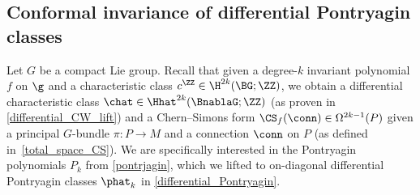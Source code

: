 
\subsection{Conformal invariance of differential Pontryagin classes}
\label{ssec:conformal_invariance}
Let $G$ be a compact Lie group. Recall that given a degree-$k$ invariant polynomial $f$ on $\g$ and a
characteristic class $c^\ZZ\in\H^{2k}(\BG;\ZZ)$, we obtain a differential characteristic class $\chat\in
\Hhat^{2k}(\BnablaG;\ZZ)$ (as proven in \cref{differential_CW_lift}) and a Chern--Simons form
$\CS_f(\conn)\in\Omega^{2k-1}(P)$ given a principal $G$-bundle $\pi\colon P\to M$ and a connection $\conn$ on $P$
(as defined in~\eqref{total_space_CS}). We are specifically interested in the Pontryagin polynomials $P_k$ from
\cref{pontrjagin}, which we lifted to on-diagonal differential Pontryagin classes $\phat_k$ in
\cref{differential_Pontryagin}.

